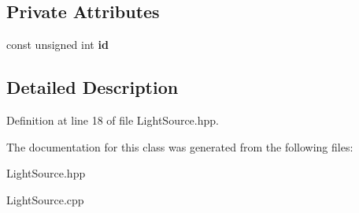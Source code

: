 \subsection*{\-Private \-Attributes}
\begin{DoxyCompactItemize}
\item 
\hypertarget{class_light_source_afe608031bd750a8ed3ea4e65c5b6e892}{const unsigned int {\bfseries id}}\label{class_light_source_afe608031bd750a8ed3ea4e65c5b6e892}

\end{DoxyCompactItemize}


\subsection{\-Detailed \-Description}


\-Definition at line 18 of file \-Light\-Source.\-hpp.



\-The documentation for this class was generated from the following files\-:\begin{DoxyCompactItemize}
\item 
\-Light\-Source.\-hpp\item 
\-Light\-Source.\-cpp\end{DoxyCompactItemize}
